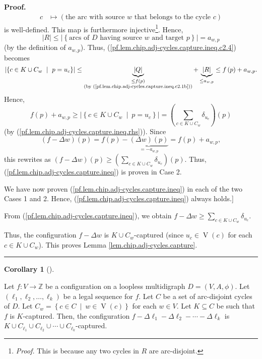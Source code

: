 \documentclass[numbers=enddot,12pt,final,onecolumn,notitlepage]{scrartcl}%
\theoremstyle{definition}
\newtheorem{coro}[theo]{Corollary}
\newenvironment{corollary}[1][]
{\begin{coro}[#1]\begin{leftbar}}
{\end{leftbar}\end{coro}}
\newenvironment{proof}[1][Proof]{\noindent\textbf{#1.} }{\ \rule{0.5em}{0.5em}}
\let\sumnonlimits\sum
\renewcommand{\sum}{\sumnonlimits\limits}
\begin{document}
\begin{proof}
\begin{align*}
c  & \mapsto\left(  \text{the arc with source }w\text{ that belongs to the
cycle }c\right)
\end{align*}
is well-defined. This map is furthermore injective\footnote{\textit{Proof.}
This is because any two cycles in $R$ are arc-disjoint.}. Hence,%
\[
\left\vert R\right\vert \leq\left\vert \left\{  \text{arcs of }D\text{ having
source }w\text{ and target }p\right\}  \right\vert =a_{w,p}%
\]
(by the definition of $a_{w,p}$). Thus,
(\ref{pf.lem.chip.adj-cycles.capture.ineq.c2.4}) becomes%
\[
\left\vert \left\{  c\in K\cup C_{w}\ \mid\ p=u_{c}\right\}  \right\vert
\leq\underbrace{\left\vert Q\right\vert }_{\substack{\leq f\left(  p\right)
\\\text{(by (\ref{pf.lem.chip.adj-cycles.capture.ineq.c2.1b}))}}%
}+\underbrace{\left\vert R\right\vert }_{\leq a_{w,p}}\leq f\left(  p\right)
+a_{w,p}.
\]
Hence,%
\[
f\left(  p\right)  +a_{w,p}\geq\left\vert \left\{  c\in K\cup C_{w}%
\ \mid\ p=u_{c}\right\}  \right\vert =\left(  \sum_{c\in K\cup C_{w}}%
\delta_{u_{c}}\right)  \left(  p\right)
\]
(by (\ref{pf.lem.chip.adj-cycles.capture.ineq.rhs})). Since%
\[
\left(  f-\Delta w\right)  \left(  p\right)  =f\left(  p\right)
-\underbrace{\left(  \Delta w\right)  \left(  p\right)  }_{=-a_{w,p}}=f\left(
p\right)  +a_{w,p},
\]
this rewrites as $\left(  f-\Delta w\right)  \left(  p\right)  \geq\left(
\sum_{c\in K\cup C_{w}}\delta_{u_{c}}\right)  \left(  p\right)  $. Thus,
(\ref{pf.lem.chip.adj-cycles.capture.ineq}) is proven in Case 2.

We have now proven (\ref{pf.lem.chip.adj-cycles.capture.ineq}) in each of the
two Cases 1 and 2. Hence, (\ref{pf.lem.chip.adj-cycles.capture.ineq}) always holds.]

From (\ref{pf.lem.chip.adj-cycles.capture.ineq}), we obtain $f-\Delta
w\geq\sum_{c\in K\cup C_{w}}\delta_{u_{c}}$. 

Thus, the configuration $f-\Delta w$ is $K\cup C_{w}$-captured (since
$u_{c}\in\operatorname*{V}\left(  c\right)  $ for each $c\in K\cup C_{w}$).
This proves Lemma \ref{lem.chip.adj-cycles.capture}.
\end{proof}

\begin{corollary}
\label{cor.chip.adj-cycles.captures}Let $f:V\rightarrow\mathbb{Z}$ be a
configuration on a loopless multidigraph $D=\left(  V,A,\phi\right)  $. Let
$\left(  \ell_{1},\ell_{2},\ldots,\ell_{k}\right)  $ be a legal sequence for
$f$. Let $C$ be a set of arc-disjoint cycles of $D$. Let $C_{w}=\left\{  c\in
C\ \mid\ w\in\operatorname*{V}\left(  c\right)  \right\}  $ for each $w\in
V$.  Let $K\subseteq C$ be such that $f$ is $K$-captured. Then, the
configuration $f-\Delta\ell_{1}-\Delta\ell_{2}-\cdots-\Delta\ell_{k}$ is
$K\cup C_{\ell_{1}}\cup C_{\ell_{2}}\cup\cdots\cup C_{\ell_{k}}$-captured.
\end{corollary}
\end{document}
